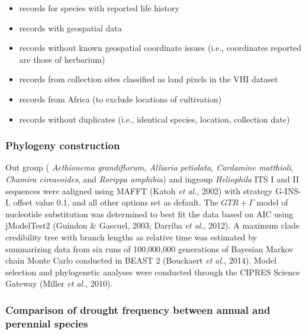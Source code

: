 \documentclass[man,floatsintext]{apa6}
\providecommand{\tightlist}{%
  \setlength{\itemsep}{0pt}\setlength{\parskip}{0pt}}
\theoremstyle{definition}
\theoremstyle{definition}
\theoremstyle{definition}
\theoremstyle{remark}
\begin{document}
\begin{itemize}
\tightlist
\item
  records for species with reported life history\\
\item
  records with geospatial data\\
\item
  records without known geospatial coordinate issues (i.e., coordinates
  reported are those of herbarium)\\
\item
  records from collection sites classified as land pixels in the VHI
  dataset\\
\item
  records from Africa (to exclude locations of cultivation)
\item
  records without duplicates (i.e., identical species, location,
  collection date)
\end{itemize}

\hypertarget{phylogeny-construction}{%
\subsubsection{Phylogeny construction}\label{phylogeny-construction}}

Out group ( \emph{Aethionema grandiflorum, Alliaria petiolata, Cardamine
matthioli, Chamira circaeoides}, and \emph{Rorippa amphibia}) and
ingroup \emph{Heliophila} ITS I and II sequences were aaligned using
MAFFT (Katoh \emph{et al.}, 2002) with strategy G-INS-I, offset value
0.1, and all other options set as default. The \(GTR + \Gamma\) model of
nucleotide substitution was determined to best fit the data based on AIC
using jModelTest2 (Guindon \& Gascuel, 2003; Darriba \emph{et al.},
2012). A maximum clade credibility tree with branch lengths as relative
time was estimated by summarizing data from six runs of 100,000,000
generations of Bayesian Markov chain Monte Carlo conducted in BEAST 2
(Bouckaert \emph{et al.}, 2014). Model selection and phylogenetic
analyses were conducted through the CIPRES Science Gateway (Miller
\emph{et al.}, 2010).

\hypertarget{comparison-of-drought-frequency-between-annual-and-perennial-species}{%
\subsubsection{Comparison of drought frequency between annual and
perennial
species}\label{comparison-of-drought-frequency-between-annual-and-perennial-species}}
\end{document}
